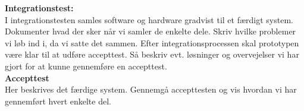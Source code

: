 \documentclass[11pt]{article}
\begin{document}
\textbf{Integrationstest:}\\
I integrationstesten samles software og hardware gradvist til et færdigt system. Dokumenter hvad der sker når vi samler de enkelte dele. Skriv hvilke problemer vi løb ind i, da vi satte det sammen. Efter integrationsprocessen skal prototypen være klar til at udføre accepttest. Så beskriv evt. løsninger og overvejelser vi har gjort for at kunne gennemføre en accepttest.\\

\textbf{Accepttest}\\
Her beskrives det færdige system. Gennemgå accepttesten og vis hvordan vi har gennemført hvert enkelte del. 



 
\end{document}
